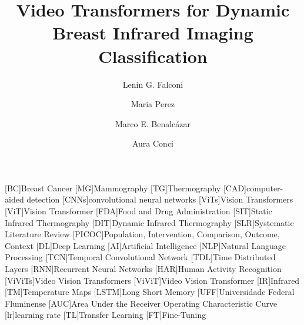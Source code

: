 \documentclass[runningheads]{llncs}
\begin{document}
\begin{acronym}
  [BC]{Breast Cancer}
  [MG]{Mammography}
  [TG]{Thermography}
  [CAD]{computer-aided detection}
  [CNNs]{convolutional neural networks}
  [ViTs]{Vision Transformers}
  [ViT]{Vision Transformer}
  [FDA]{Food and Drug Administration}
  [SIT]{Static Infrared Thermography}
  [DIT]{Dynamic Infrared Thermography}
  [SLR]{Systematic Literature Review}
  [PICOC]{Population, Intervention, Comparison, Outcome,
    Context}
  [DL]{Deep Learning}
  [AI]{Artificial Intelligence}
  [NLP]{Natural Language Processing}
  [TCN]{Temporal Convolutional Network}
  [TDL]{Time Distributed Layers}
  [RNN]{Recurrent Neural Networks}
  [HAR]{Human Activity Recognition}
  [ViViTs]{Video Vision Transformers}
  [ViViT]{Video Vision Transformer}
  [IR]{Infrared}
  [TM]{Temperature Maps}
  [LSTM]{Long Short Memory}
  [UFF]{Universidade Federal Fluminense}
  [AUC]{Area Under the Receiver Operating Characteristic
    Curve}
  [lr]{learning rate}
  [TL]{Transfer Learning}
  [FT]{Fine-Tuning}
\end{acronym}

% 
\title{Video Transformers for Dynamic Breast Infrared Imaging Classification}
%

% 
\author{Lenin G. Falconi \and
  Maria Perez \and
  Marco E. Benalcázar \and 
Aura Conci}
% 
%
\end{document}

